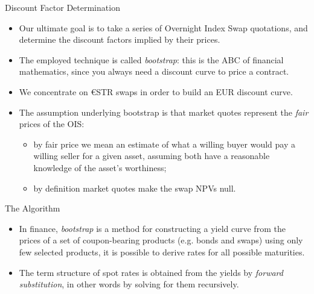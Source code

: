 \documentclass{beamer}
\begin{document}
%        
% 
% 
%
%
%
%
%

\begin{frame}{Discount Factor Determination}
\begin{itemize}
\item Our ultimate goal is to take a series of Overnight Index Swap quotations, and determine the discount factors implied by their prices. 
\item The employed technique is called \emph{bootstrap}: this is the ABC of financial mathematics, since you always need a discount curve to price a contract.
\item We concentrate on €STR swaps in order to build an EUR discount curve.
\item The assumption underlying bootstrap is that market quotes represent the \emph{fair} prices of the OIS:
\begin{itemize}
  \item by fair price we mean an estimate of what a willing buyer would pay a willing seller for a given asset, assuming both have a reasonable knowledge of the asset's worthiness;
  \item by definition market quotes make the swap NPVs null.
  \end{itemize}
  \end{itemize}
\end{frame}  
  
\begin{frame}{The Algorithm}
\begin{itemize} 
\item In finance, \emph{bootstrap} is a method for constructing a yield curve from the prices of a set of coupon-bearing products (e.g. bonds and swaps) using only few selected products, it is possible to derive rates for all possible maturities.
\item The term structure of spot rates is obtained from the yields by \emph{forward substitution}, in other words by solving for them recursively. 
\end{itemize}
\end{frame} 
\end{document}
